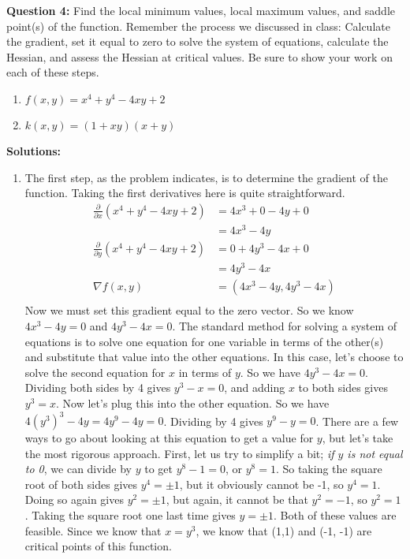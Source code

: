\documentclass[10pt]{amsart}
\begin{document}
\medskip


\textbf{Question 4:} Find the local minimum values, local maximum values, and saddle point(s) of the function. Remember the process we discussed in class: Calculate the gradient, set it equal to zero to solve the system of equations, calculate the Hessian, and assess the Hessian at critical values. Be sure to show your work on each of these steps.
\begin{enumerate}
\item $f(x,y) = x^4 + y^4 - 4xy + 2$
\item $k(x,y) = (1+xy)(x+y)$
\end{enumerate}

\textbf{Solutions:}
\begin{enumerate}
\item The first step, as the problem indicates, is to determine the gradient of the function. Taking the first derivatives here is quite straightforward. 
\begin{align*}
\frac{\partial}{\partial x}(x^4 + y^4 - 4xy + 2) &= 4x^3 + 0 -4y + 0\\
&=  4x^3 - 4y\\
\frac{\partial}{\partial y}(x^4 + y^4 - 4xy + 2) &= 0 + 4y^3 - 4x + 0\\
&= 4y^3 - 4x\\
\nabla f(x,y) &=(4x^3 - 4y, 4y^3-4x)\\
\end{align*}
Now we must set this gradient equal to the zero vector. So we know $4x^3 - 4y = 0$ and $4y^3 - 4x = 0$. The standard method for solving a system of equations is to solve one equation for one variable in terms of the other(s) and substitute that value into the other equations. In this case, let's choose to solve the second equation for $x$ in terms of $y$. So we have $4y^3 - 4x = 0$. Dividing both sides by 4 gives $y^3 - x = 0$, and adding $x$ to both sides gives $y^3 = x$. Now let's plug this into the other equation. So we have $4(y^3)^3 - 4y = 4y^9 -4y = 0$. Dividing by 4 gives $y^9 - y = 0$. There are a few ways to go about looking at this equation to get a value for $y$, but let's take the most rigorous approach. First, let us try to simplify a bit; \emph{if $y$ is not equal to 0}, we can divide by $y$ to get $y^8 - 1 = 0$, or $y^8 = 1$. So taking the square root of both sides gives $y^4 = \pm 1$, but it obviously cannot be -1, so $y^4 = 1$. Doing so again gives $y^2 = \pm 1$, but again, it cannot be that $y^2 = -1$, so $y^2 = 1$. Taking the square root one last time gives $y = \pm 1$. Both of these values are feasible. Since we know that $x = y^3$, we know that (1,1) and (-1, -1) are critical points of this function. 


\end{enumerate}
\end{document}
